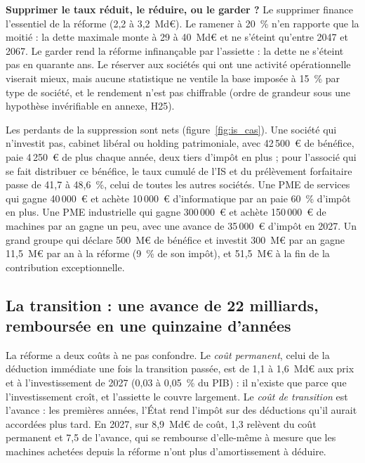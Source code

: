 \textbf{Supprimer le taux réduit, le réduire, ou le garder ?} Le supprimer finance l'essentiel de la réforme (2,2 à
3,2~Md€). Le ramener à 20~\% n'en rapporte que la moitié : la dette maximale monte à 29 à 40~Md€ et ne s'éteint
qu'entre 2047 et 2067. Le garder rend la réforme infinançable par l'assiette : la dette ne s'éteint pas en quarante ans.
Le réserver aux sociétés qui ont une activité opérationnelle viserait mieux, mais aucune statistique ne ventile la base
imposée à 15~\% par type de société, et le rendement n'est pas chiffrable (ordre de grandeur sous une hypothèse
invérifiable en annexe, H25).

Les perdants de la suppression sont nets (figure~\ref{fig:is_cas}). Une société qui n'investit pas, cabinet libéral ou
holding patrimoniale, avec 42\,500~€ de bénéfice, paie 4\,250~€ de plus chaque année, deux tiers d'impôt en plus ; pour
l'associé qui se fait distribuer ce bénéfice, le taux cumulé de l'IS et du prélèvement forfaitaire passe de 41,7 à
48,6~\%, celui de toutes les autres sociétés. Une PME de services qui gagne 40\,000~€ et achète 10\,000~€
d'informatique par an paie 60~\% d'impôt en plus. Une PME industrielle qui gagne 300\,000~€ et achète 150\,000~€ de
machines par an gagne un peu, avec une avance de 35\,000~€ d'impôt en 2027. Un grand groupe qui déclare 500~M€ de
bénéfice et investit 300~M€ par an gagne 11,5~M€ par an à la réforme (9~\% de son impôt), et 51,5~M€ à la fin de la
contribution exceptionnelle.


\subsection{La transition : une avance de 22 milliards, remboursée en une quinzaine d'années}\label{sec:is_transition}

La réforme a deux coûts à ne pas confondre. Le \emph{coût permanent}, celui de la déduction immédiate une fois la
transition passée, est de 1,1 à 1,6~Md€ aux prix et à l'investissement de 2027 (0,03 à 0,05~\% du PIB) : il n'existe
que parce que l'investissement croît, et l'assiette le couvre largement. Le \emph{coût de transition} est
l'avance : les premières années, l'État rend l'impôt sur des déductions qu'il aurait accordées plus tard. En 2027, sur
8,9~Md€ de coût, 1,3 relèvent du coût permanent et 7,5 de l'avance, qui se rembourse d'elle-même à mesure que les
machines achetées depuis la réforme n'ont plus d'amortissement à déduire.

